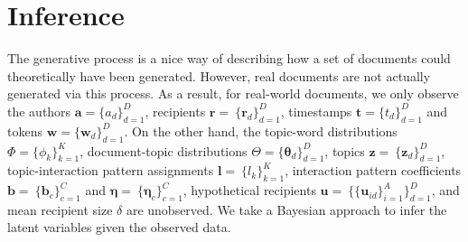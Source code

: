 \documentclass[twoside]{article}
\begin{document}
\section{Inference}\label{sec:Inference}
The generative process is a nice way of describing how a set of documents could theoretically have been generated. However,
real documents are not actually generated via this process. As a result, for real-world documents, we only observe the authors $\boldsymbol{a}= \{a_d\}_{d=1}^D$, recipients $\boldsymbol{r}=\ \{\boldsymbol{r}_d\}_{d=1}^D$, timestamps $\boldsymbol{t}= \{t_d\}_{d=1}^D$ and tokens $\boldsymbol{w}= \{\boldsymbol{w}_d\}_{d=1}^D$. On the other hand, the topic-word distributions $\Phi =  \{\phi_k\}_{k=1}^K$, document-topic distributions $\Theta = \{\boldsymbol{\theta}_d\}_{d=1}^D$, topics $\boldsymbol{z}=\ \{\boldsymbol{z}_d\}_{d=1}^D$, topic-interaction pattern assignments $\boldsymbol{l}=\ \{l_k\}_{k=1}^K$, interaction pattern coefficients $\boldsymbol{b}=\ \{\boldsymbol{b}_c\}_{c=1}^C$ and $\boldsymbol{\eta}=\ \{\boldsymbol{\eta}_c\}_{c=1}^C$, hypothetical recipients $\boldsymbol{u}=\ \{\{\boldsymbol{u}_{id}\}_{i=1}^A\}_{d=1}^D$, and mean recipient size $\delta$ are unobserved. We take a Bayesian approach to infer the latent variables given the observed data. 
\end{document}
